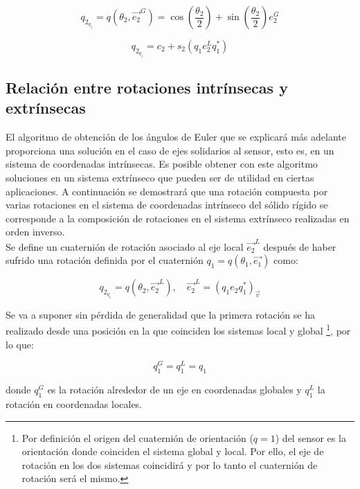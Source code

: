 \documentclass[12pt, a4paper]{report}
\begin{document}
$$ q_{2_{q_1}} = q(\theta_2, \vec{e_2}^G) = \cos\left( \frac{\theta_2}{2}\right) + \sin\left( \frac{\theta_2}{2} \right)e_2^G $$

\begin{equation} \label{eq: q_2_q_1}
q_{2_{q_1}} =  c_2 + s_2(q_1e_2^Lq_1^*)
\end{equation} 

\subsection{Relación entre rotaciones intrínsecas y extrínsecas}

El algoritmo de obtención de los ángulos de Euler que se explicará más adelante proporciona una solución en el caso de ejes solidarios al sensor, esto es, en un sistema de coordenadas intrínsecas. Es posible obtener con este algoritmo soluciones en un sistema extrínseco que pueden ser de utilidad en ciertas aplicaciones. A continuación se demostrará que una rotación compuesta por varias rotaciones en el sistema de coordenadas intrínseco del sólido rígido se corresponde a la composición de rotaciones en el sistema extrínseco realizadas en orden inverso.\\

Se define un cuaternión de rotación asociado al eje local $\vec{e_2}^L$ después de haber sufrido una rotación definida por el cuaternión $q_1 = q\left( \theta_1 , \vec{e_1} \right)$ como:

\begin{equation}
q_{2_{q_1}} = q\left(\theta_2 , \vec{e_2}^L \right) , \quad \vec{e_2}^L = (q_1e_2q_1^*)_{\vec{v}}
\end{equation}

Se va a suponer sin pérdida de generalidad que la primera rotación se ha realizado desde una posición en la que coinciden los sistemas local y global  \footnote{Por definición el origen del  cuaternión de orientación ($q = 1$) del sensor es la orientación donde coinciden el sistema global y local. Por ello, el eje de rotación en los dos sistemas coincidirá y por lo tanto el cuaternión de rotación será el mismo.}, por lo que:

\begin{equation}
q_1^G = q_1^L = q_1
\end{equation}

donde $q_1^G$ es la rotación alrededor de un eje en coordenadas globales y $q_1^L$ la rotación en coordenadas locales.\\
\end{document}
